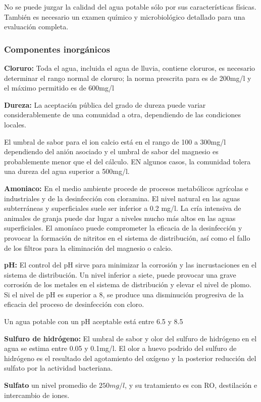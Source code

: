 No se puede juzgar la calidad del agua potable sólo por sus características físicas. También es necesario un examen químico y microbiológico detallado para una evaluación completa.

\subsubsection{Componentes inorgánicos}
\textbf{Cloruro:} Toda el agua, incluida el agua de lluvia, contiene cloruros, es necesario determinar el rango normal de cloruro; la norma prescrita para es de 200mg/l y el máximo permitido es de 600mg/l

\textbf{Dureza:} La aceptación pública del grado de dureza puede variar considerablemente de una comunidad a otra, dependiendo  de las condiciones locales.

El umbral de sabor para el ion calcio está en el rango de 100 a 300mg/l dependiendo del anión asociado y el umbral de sabor del magnesio es probablemente menor que el del cálculo. EN algunos casos, la comunidad tolera una dureza del agua superior a 500mg/l.

\textbf{Amoniaco:} En el medio ambiente procede de procesos metabólicos agrícolas e industriales y de la desinfección con cloramina. El nivel natural en las aguas subterráneas y superficiales suele ser inferior a 0.2 mg/l. La cría intensiva de animales de granja puede dar lugar a niveles mucho más altos en las aguas superficiales. El amoníaco puede comprometer la eficacia de la desinfección y provocar la formación de nitritos en el sistema de distribución, así como el fallo de los filtros para la eliminación del magnesio o calcio.

\textbf{pH:} El control del pH sirve para minimizar la corrosión y las incrustaciones en el sistema de distribución. Un nivel inferior a siete, puede provocar una grave corrosión de los metales en el sistema de distribución y elevar el nivel de plomo. Si el nivel de pH es superior a 8, se produce una disminución progresiva de la eficacia del proceso de desinfección con cloro.

Un agua potable con un pH aceptable está entre 6.5 y 8.5

\textbf{Sulfuro de hidrógeno:} El umbral de sabor y olor del sulfuro de hidrógeno en el agua se estima entre 0.05 y 0.1mg/l. El olor a huevo podrido del sulfuro de hidrógeno es el resultado del agotamiento del oxígeno y la posterior reducción del sulfato por la actividad bacteriana.

\textbf{Sulfato} un nivel promedio de $250mg/l$, y su tratamiento es con RO, destilación e intercambio de iones.

